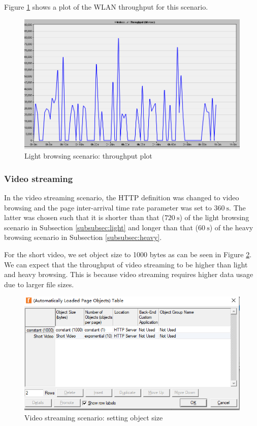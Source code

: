 Figure \ref{fig:simul:riverbed:heavy:4} shows a plot of the \gls{WLAN} throughput for this scenario.

\begin{figure}[H]
	\centering
	\includegraphics[scale=0.42]{Figures/amantianrenamed/ScenariooneThroughputofHeavybrowsing.png}
	\caption{Light browsing scenario: throughput plot}
	\label{fig:simul:riverbed:heavy:4}
\end{figure}

\subsubsection{Video streaming} \label{subsubsec:video}
In the video streaming scenario, the \gls{HTTP} definition was changed to video browsing and the page inter-arrival time rate parameter was set to $360~\mathrm{s}$. The latter was chosen such that it is shorter than that ($720~\mathrm{s}$) of the light browsing scenario in Subsection \ref{subsubsec:light} and longer than that ($60~\mathrm{s}$) of the heavy browsing scenario in Subsection \ref{subsubsec:heavy}.

For the short video, we set object size to 1000 bytes as can be seen in Figure \ref{fig:simul:riverbed:video:1}. We can expect that the throughput of video streaming to be higher than light and heavy browsing. This is because video streaming requires higher data usage due to larger file sizes.

\begin{figure}[H]
	\centering
	\includegraphics[scale=0.54]{Figures/amantianrenamed/ScenariooneVideoStreamingobjectsize.png}
	\caption{Video streaming scenario: setting object size}
	\label{fig:simul:riverbed:video:1}
\end{figure}

